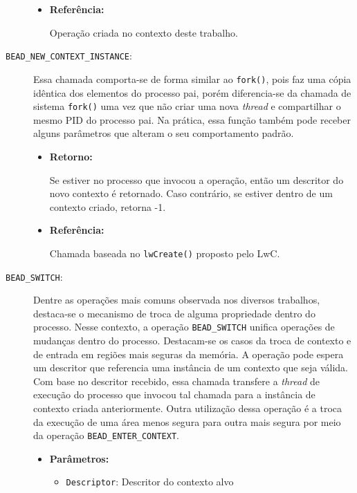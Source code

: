 \begin{description}
\begin{itemize}
    \item \textbf{Referência:}

Operação criada no contexto deste trabalho.

	\end{itemize}

  \item [\texttt{BEAD\_NEW\_CONTEXT\_INSTANCE}:]

Essa chamada comporta-se de forma similar ao \texttt{fork()}, pois
faz uma cópia idêntica dos elementos do processo pai, porém diferencia-se da
chamada de sistema \texttt{fork()} uma vez que não criar uma nova \emph{thread} e
compartilhar o mesmo PID do processo pai. Na prática, essa função também pode
receber alguns parâmetros que alteram o seu comportamento padrão.

  \begin{itemize}
    \item \textbf{Retorno:}

Se estiver no processo que invocou a operação, então um descritor do novo
contexto é retornado. Caso contrário, se estiver dentro de um contexto criado,
retorna -1.

    \item \textbf{Referência:}

Chamada baseada no \texttt{lwCreate()} proposto pelo LwC.

  \end{itemize}

  \item [\texttt{BEAD\_SWITCH}:]

Dentre as operações mais comuns observada nos diversos trabalhos, destaca-se o
mecanismo de troca de alguma propriedade dentro do processo. Nesse contexto, a
operação \texttt{BEAD\_SWITCH} unifica operações de mudanças dentro do
processo. Destacam-se os casos da troca de contexto e de entrada em regiões
mais seguras da memória. A operação pode espera um descritor que referencia uma
instância de um contexto que seja válida. Com base no descritor recebido, essa
chamada transfere a \emph{thread} de execução do processo que invocou tal chamada para
a instância de contexto criada anteriormente. Outra utilização dessa operação é
a troca da execução de uma área menos segura para outra mais segura por meio da
operação \texttt{BEAD\_ENTER\_CONTEXT}.

  \begin{itemize}
    \item \textbf{Parâmetros:} 

    \begin{itemize}
      \item \texttt{Descriptor}: Descritor do contexto alvo
    \end{itemize}


\end{itemize}
\end{description}
